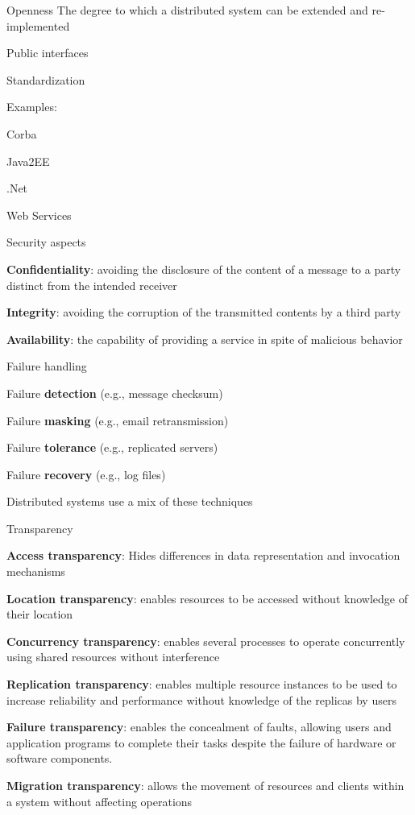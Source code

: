 \begin{frame}{Openness}
The degree to which a distributed system can be extended and re-implemented
\BI
\item Public interfaces
\item Standardization	
\EI

\bigskip
Examples:
\BI
\item Corba
\item Java2EE
\item .Net
\item Web Services
\EI
\end{frame}

\begin{frame}{Security aspects}

\BI
\item \textbf{Confidentiality}: avoiding the disclosure of the content of a message to a party distinct from the intended receiver
\bigskip
\item \textbf{Integrity}: avoiding the corruption of the transmitted contents by a third party
\bigskip
\item \textbf{Availability}: the capability of providing a service in spite of malicious behavior
\EI
\end{frame}

\begin{frame}{Failure handling}
\BI
\bigskip
\item Failure \textbf{detection} (e.g., message checksum)
\bigskip
\item Failure \textbf{masking} (e.g., email retransmission)
\bigskip
\item Failure \textbf{tolerance} (e.g., replicated servers)
\bigskip
\item Failure \textbf{recovery} (e.g., log files)
\EI

\bigskip
Distributed systems use a mix of these techniques
\end{frame}

\begin{frame}{Transparency}
\BI
\item \textbf{Access transparency}:  Hides differences in data representation and invocation mechanisms
\item \textbf{Location transparency}:  enables resources to be accessed without knowledge of their location
\item \textbf{Concurrency transparency}: enables several processes to operate concurrently using shared resources without interference 
\item \textbf{Replication transparency}: enables multiple resource instances to be used to increase reliability and performance without knowledge of the replicas by users
\item \textbf{Failure transparency}: enables the concealment of faults, allowing users and application programs to complete their tasks despite the failure of hardware or software components.
\item \textbf{Migration transparency}: allows the movement of resources and clients within a system without affecting operations
\EI
\end{frame}


